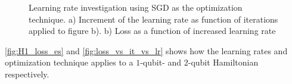 \documentclass[../main.tex]{subfiles}
\begin{document}
\begin{figure}%
    \centering
    \hspace*{-0.1\textwidth}
    \caption{Learning rate investigation using SGD as the optimization technique. a) Increment of the learning rate as function of iterations applied to figure b). b) Loss as a function of increased learning rate}%
    \label{fig:lr_exp}%
\end{figure}

\autoref{fig:H1_loss_es} and \autoref{fig:loss_vs_it_vs_lr} shows how the learning rates and optimization technique applies to a $1$-qubit- and $2$-qubit Hamiltonian respectively.
\end{document}
